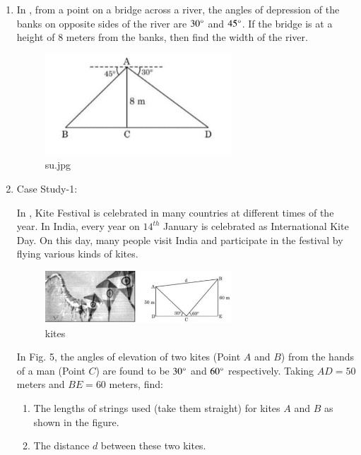 \begin{enumerate}[label=\thesubsection.\arabic*.,ref=\thesubsection.\theenumi]
    \hfill{}\item In , from a point on a bridge across a river, the angles of depression of the banks on opposite sides of the river are $30\degree$ and $45\degree$. If the bridge is at a height of $8$ meters from the banks, then find the width of the river.
    \begin{figure}[H]
        \centering
        \includegraphics[width=70mm]{cbse/figs/su.jpeg}
        \caption{su.jpg}
        \label{fig:su.jpeg}
    \end{figure}
    
    \hfill{}\item Case Study-1:
    
    In , Kite Festival is celebrated in many countries at different times of the year. In India, every year on $14^{th}$ January is celebrated as International Kite Day. On this day, many people visit India and participate in the festival by flying various kinds of kites.
    
    \begin{figure}[H]
	\centering
        \includegraphics[width=70mm]{cbse/figs/kite.jpeg}
        \caption{kites}
        \label{fig:kite.jpeg}
    \end{figure}
    
    In Fig. 5, the angles of elevation of two kites (Point $A$ and $B$) from the hands of a man (Point $C$) are found to be $30\degree$ and $60\degree$ respectively. Taking $AD = 50$ meters and $BE = 60$ meters, find:
    \begin{enumerate}
        \item The lengths of strings used (take them straight) for kites $A$ and $B$ as shown in the figure.
        \item The distance $d$ between these two kites.
    \end{enumerate}
    

\end{enumerate}
